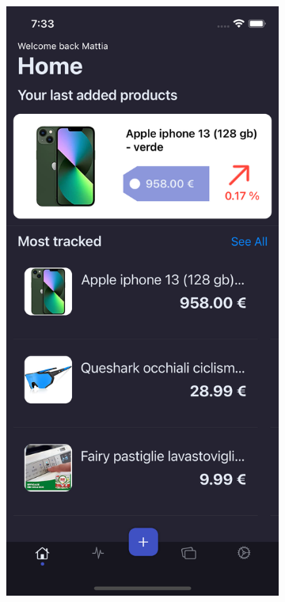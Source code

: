 \begin{figure}[h!]
        \centering
        \begin{subfigure}[b]{0.3\textwidth}
            \centering
            \includegraphics[width=\textwidth]{images/interfaces/home_screen.png}

\end{subfigure}
\end{figure}
